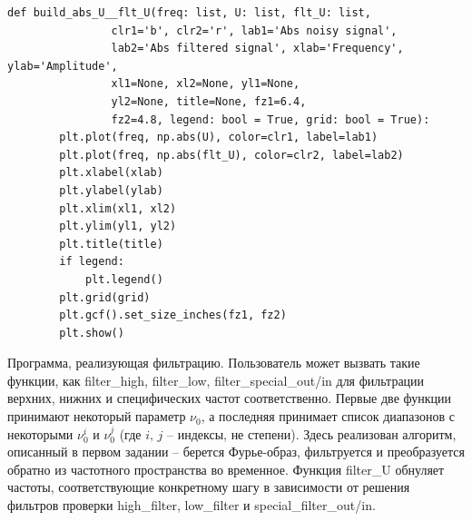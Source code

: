 \documentclass[a4paper, 12pt]{article}
\begin{document}
\begin{lstlisting}[label=l3, caption={Файл builder.py. Реализация построения графиков.}]
    def build_abs_U__flt_U(freq: list, U: list, flt_U: list,
                clr1='b', clr2='r', lab1='Abs noisy signal',
                lab2='Abs filtered signal', xlab='Frequency', ylab='Amplitude',
                xl1=None, xl2=None, yl1=None, 
                yl2=None, title=None, fz1=6.4, 
                fz2=4.8, legend: bool = True, grid: bool = True):
        plt.plot(freq, np.abs(U), color=clr1, label=lab1)
        plt.plot(freq, np.abs(flt_U), color=clr2, label=lab2)
        plt.xlabel(xlab)
        plt.ylabel(ylab)
        plt.xlim(xl1, xl2)
        plt.ylim(yl1, yl2)
        plt.title(title)
        if legend:
            plt.legend()
        plt.grid(grid)
        plt.gcf().set_size_inches(fz1, fz2)
        plt.show()
    \end{lstlisting}


    Программа, реализующая фильтрацию. Пользователь может вызвать такие функции, как filter\_{high}, filter\_{low}, filter\_{special}\_{out}/{in}
    для фильтрации верхних, нижних и специфических частот соответственно. Первые две функции принимают некоторый параметр
    $\nu_0$, а последняя принимает список диапазонов с некоторыми $\nu_{0}^{i}$ и $\nu_{0}^{j}$ (где $i,\,j$ -- индексы, не степени).
    Здесь реализован алгоритм, описанный в первом задании -- берется Фурье-образ, фильтруется и преобразуется обратно из частотного
    пространства во временное. Функция filter\_{U} обнуляет частоты, соответствующие конкретному шагу в зависимости от решения фильтров
    проверки high\_{filter}, low\_{filter} и special\_{filter}\_{out}/{in}.
\end{document}
